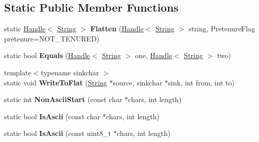 \subsection*{Static Public Member Functions}
\begin{DoxyCompactItemize}
\item 
\hypertarget{classv8_1_1internal_1_1_string_abaa5a56b1b930ba3b50a98f33c953f3f}{}static \hyperlink{classv8_1_1internal_1_1_handle}{Handle}$<$ \hyperlink{classv8_1_1internal_1_1_string}{String} $>$ {\bfseries Flatten} (\hyperlink{classv8_1_1internal_1_1_handle}{Handle}$<$ \hyperlink{classv8_1_1internal_1_1_string}{String} $>$ string, Pretenure\+Flag pretenure=N\+O\+T\+\_\+\+T\+E\+N\+U\+R\+E\+D)\label{classv8_1_1internal_1_1_string_abaa5a56b1b930ba3b50a98f33c953f3f}

\item 
\hypertarget{classv8_1_1internal_1_1_string_a8982711c2ae6275d16fa21386410f066}{}static bool {\bfseries Equals} (\hyperlink{classv8_1_1internal_1_1_handle}{Handle}$<$ \hyperlink{classv8_1_1internal_1_1_string}{String} $>$ one, \hyperlink{classv8_1_1internal_1_1_handle}{Handle}$<$ \hyperlink{classv8_1_1internal_1_1_string}{String} $>$ two)\label{classv8_1_1internal_1_1_string_a8982711c2ae6275d16fa21386410f066}

\item 
\hypertarget{classv8_1_1internal_1_1_string_a089b286065c47f7ec627ce18710f3f44}{}{\footnotesize template$<$typename sinkchar $>$ }\\static void {\bfseries Write\+To\+Flat} (\hyperlink{classv8_1_1internal_1_1_string}{String} $\ast$source, sinkchar $\ast$sink, int from, int to)\label{classv8_1_1internal_1_1_string_a089b286065c47f7ec627ce18710f3f44}

\item 
\hypertarget{classv8_1_1internal_1_1_string_a1d5c14238cade24eaa92c57856deb69f}{}static int {\bfseries Non\+Ascii\+Start} (const char $\ast$chars, int length)\label{classv8_1_1internal_1_1_string_a1d5c14238cade24eaa92c57856deb69f}

\item 
\hypertarget{classv8_1_1internal_1_1_string_af725d9dc277683fa4486a928348ba75a}{}static bool {\bfseries Is\+Ascii} (const char $\ast$chars, int length)\label{classv8_1_1internal_1_1_string_af725d9dc277683fa4486a928348ba75a}

\item 
\hypertarget{classv8_1_1internal_1_1_string_a4960adf7c08c3c7f4ff6cb3091341288}{}static bool {\bfseries Is\+Ascii} (const uint8\+\_\+t $\ast$chars, int length)\label{classv8_1_1internal_1_1_string_a4960adf7c08c3c7f4ff6cb3091341288}


\end{DoxyCompactItemize}
